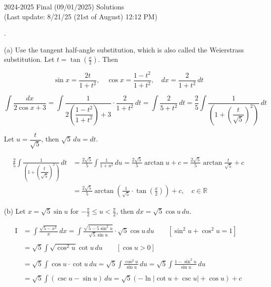 \documentclass{article}
\begin{document}
\newpage

\begin{center}
2024-2025 Final (09/01/2025) Solutions\\
(Last update: 8/21/25 (21st of August) 12:12 PM)
\end{center}

.

\hfill

\noindent (a) Use the tangent half-angle substitution, which is also called the Weierstrass substitution. Let $\displaystyle t = \tan\left(\frac x2\right)$. Then

\[\sin x={\frac{2t}{1+t^{2}}},\quad\cos x={\frac{1-t^{2}}{1+t^{2}}},\quad dx={\frac2{1+t^{2}}}\,dt\]

\[\int\frac{dx}{2\cos x+3}=\int\frac1{2\left(\dfrac{1-t^2}{1+t^2}\right)+3}\cdot\frac2{1+t^2}\,dt=\int\frac2{5+t^2}\,dt=\frac25\int\frac1{\left(1+\left(\dfrac t{\sqrt5}\right)^2\right)}\,dt\]

\hfill

\noindent Let $u=\dfrac t{\sqrt5}$, then $\sqrt5\,du=dt$.

\begin{align*}\frac25\int\frac1{\left(1+\left(\dfrac t{\sqrt5}\right)^2\right)}\,dt&=\frac{2\sqrt5}5\int\frac1{1+u^2}\,du=\frac{2\sqrt5}5\arctan u+c=\frac{2\sqrt5}5\arctan\frac t{\sqrt5}+c\\&=\boxed{\frac{2\sqrt5}5\arctan\left(\frac1{\sqrt5}\cdot\tan\left(\frac x2\right)\right)+c,\quad c\in\mathbb{R}}\end{align*}

\hfill

\hfill

\noindent (b) Let $\displaystyle x=\sqrt5\sin u$ for $\displaystyle-\frac\pi2\leq u<\frac\pi2$, then $dx=\displaystyle\sqrt5\cos u\,du$.

\begin{align*}\mathrm{I}&=\int\frac{\sqrt{5-x^2}}{x}\,dx=\int\frac{\sqrt{5-5\sin^2u}}{\sqrt5\sin u}\cdot\sqrt5\cos u\,du\qquad\left[\sin^2u+\cos^2u=1\right]\\\\&=\sqrt5\int\sqrt{\cos^2u}\cot u\,du\qquad\left[\cos u>0\right]\\\\&=\sqrt5\int\cos u\cdot\cot u\,du=\sqrt5\int\frac{\cos^2u}{\sin u}\,du=\sqrt5\int\frac{1-\sin^2u}{\sin u}\,du\\\\&=\sqrt5\int\left(\csc u-\sin u\right)\,du=\sqrt5\left(-\ln\left|\cot u+\csc u\right|+\cos u\right)+c\end{align*}
\end{document}
